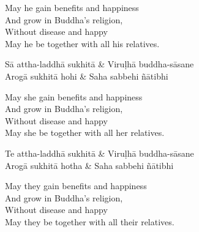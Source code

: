 \begin{english}
  May he gain benefits and happiness\\
  And grow in Buddha’s religion,\\
  Without disease and happy\\
  May he be together with all his relatives.
\end{english}

\begin{twochants}
  Sā attha-laddhā sukhitā & Viruḷhā buddha-sāsane\\
  Arogā sukhitā hohi & Saha sabbehi ñātibhi
\end{twochants}

\begin{english}
  May she gain benefits and happiness\\
  And grow in Buddha’s religion,\\
  Without disease and happy\\
  May she be together with all her relatives.
\end{english}

\begin{twochants}
  Te attha-laddhā sukhitā & Viruḷhā buddha-sāsane\\
  Arogā sukhitā hotha & Saha sabbehi ñātibhi
\end{twochants}

\begin{english}
  May they gain benefits and happiness\\
  And grow in Buddha’s religion,\\
  Without disease and happy\\
  May they be together with all their relatives.
\end{english}


